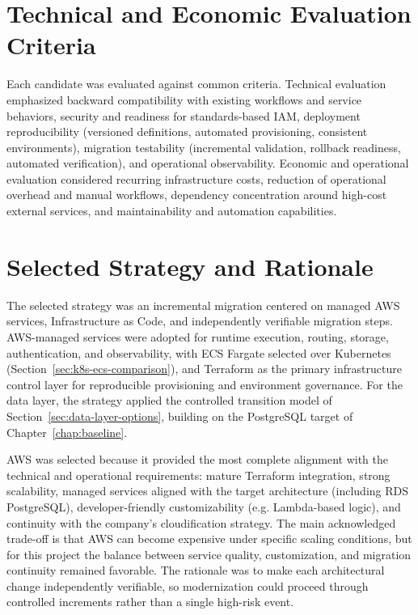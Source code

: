 \section{Technical and Economic Evaluation Criteria}
Each candidate was evaluated against common criteria. Technical evaluation emphasized backward compatibility with existing workflows and service behaviors, security and readiness for standards-based IAM, deployment reproducibility (versioned definitions, automated provisioning, consistent environments), migration testability (incremental validation, rollback readiness, automated verification), and operational observability. Economic and operational evaluation considered recurring infrastructure costs, reduction of operational overhead and manual workflows, dependency concentration around high-cost external services, and maintainability and automation capabilities.

\section{Selected Strategy and Rationale}
The selected strategy was an incremental migration centered on managed AWS services, Infrastructure as Code, and independently verifiable migration steps. AWS-managed services were adopted for runtime execution, routing, storage, authentication, and observability, with ECS Fargate selected over Kubernetes (Section~\ref{sec:k8s-ecs-comparison}), and Terraform as the primary infrastructure control layer for reproducible provisioning and environment governance. For the data layer, the strategy applied the controlled transition model of Section~\ref{sec:data-layer-options}, building on the PostgreSQL target of Chapter~\ref{chap:baseline}.

AWS was selected because it provided the most complete alignment with the technical and operational requirements: mature Terraform integration, strong scalability, managed services aligned with the target architecture (including RDS PostgreSQL), developer-friendly customizability (e.g. Lambda-based logic), and continuity with the company's cloudification strategy. The main acknowledged trade-off is that AWS can become expensive under specific scaling conditions, but for this project the balance between service quality, customization, and migration continuity remained favorable. The rationale was to make each architectural change independently verifiable, so modernization could proceed through controlled increments rather than a single high-risk event.

